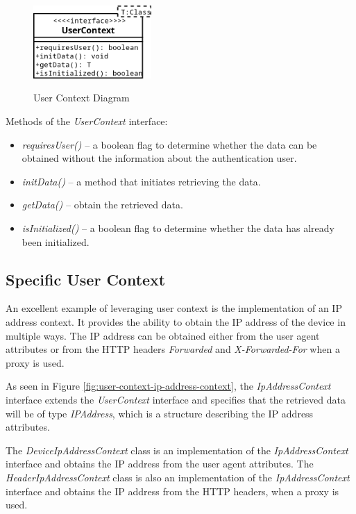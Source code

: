\begin{figure}[htbp]
  \centering
  \includegraphics[width=0.4\textwidth]{img/sections/5-design/userContext.png}
  \label{fig:user-context-diagram}
  \caption{User Context Diagram}
\end{figure}

Methods of the \textit{UserContext} interface:
\begin{itemize}
    \item \textit{requiresUser()} -- a boolean flag to determine whether the data can be obtained without the information about the authentication user.
    \item \textit{initData()} -- a method that initiates retrieving the data.
    \item \textit{getData()} -- obtain the retrieved data. 
    \item \textit{isInitialized()} -- a boolean flag to determine whether the data has already been initialized. 
\end{itemize}

\newpage

\subsection{Specific User Context}
An excellent example of leveraging user context is the implementation of an IP address context.
It provides the ability to obtain the IP address of the device in multiple ways.
The IP address can be obtained either from the user agent attributes or from the HTTP headers \textit{Forwarded} and \textit{X-Forwarded-For} when a proxy is used.

As seen in Figure \ref{fig:user-context-ip-address-context}, the \textit{IpAddressContext} interface extends the \textit{UserContext} interface and specifies that the retrieved data will be of type \textit{IPAddress}, which is a structure describing the IP address attributes.

The \textit{DeviceIpAddressContext} class is an implementation of the \textit{IpAddressContext} interface and obtains the IP address from the user agent attributes.
The \textit{HeaderIpAddressContext} class is also an implementation of the \textit{IpAddressContext} interface and obtains the IP address from the HTTP headers, when a proxy is used.


